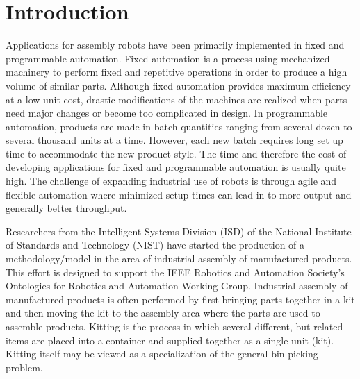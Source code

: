 \documentclass[final,3p,12pt]{elsarticle}
\begin{document}
\section{Introduction}
\label{sect:introduction}

Applications for assembly robots have been primarily implemented in fixed and programmable automation. Fixed automation is a process using mechanized machinery to perform fixed and repetitive operations in order to produce a high volume of similar parts. Although fixed automation provides maximum efficiency at a low unit cost, drastic modifications of the machines are realized when parts need major changes or become too complicated in design. In programmable automation, products are made in batch quantities ranging from several dozen to several thousand units at a time. However, each new batch requires long set up time to accommodate the new product style. The time and therefore the cost of developing applications for fixed and programmable automation is usually quite high. The challenge of expanding industrial use of robots is through agile and flexible automation where minimized setup times can lead in to more output and generally better throughput.


Researchers from the Intelligent Systems Division (ISD) of the National Institute of Standards and Technology (NIST) have started the production of a methodology/model in the area of industrial assembly of manufactured products. This effort is designed to support the IEEE Robotics and Automation Society's Ontologies for Robotics and Automation Working Group. Industrial assembly of manufactured products is often performed by first bringing parts together in a kit and then moving the kit to the assembly area where the parts are used to assemble products. Kitting is the process in which several different, but related items are placed into a container and supplied together as a single unit (kit). Kitting itself may be viewed as a specialization of the general bin-picking problem.
\end{document}
